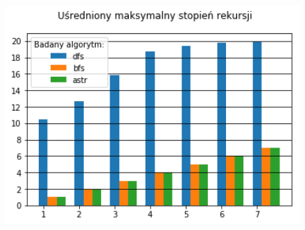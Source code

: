 \documentclass{classrep}
\begin{document}
\begin{figure}[H]
  \centering
    \begin{minipage}{0.45\textwidth}
        \centering
        \includegraphics[width=1.1\textwidth]{output_3_3.png}
    \end{minipage}
\end{figure}

\end{document}
